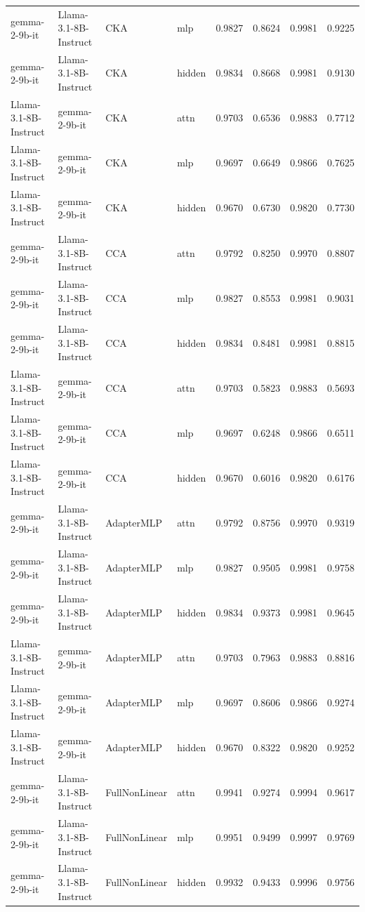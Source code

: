 {\begin{tabularx}{\textwidth}{XXXlcccc}
gemma-2-9b-it & Llama-3.1-8B-Instruct & CKA & mlp & 0.9827 & 0.8624 & 0.9981 & 0.9225 \\
gemma-2-9b-it & Llama-3.1-8B-Instruct & CKA & hidden & 0.9834 & 0.8668 & 0.9981 & 0.9130 \\
Llama-3.1-8B-Instruct & gemma-2-9b-it & CKA & attn & 0.9703 & 0.6536 & 0.9883 & 0.7712 \\
Llama-3.1-8B-Instruct & gemma-2-9b-it & CKA & mlp & 0.9697 & 0.6649 & 0.9866 & 0.7625 \\
Llama-3.1-8B-Instruct & gemma-2-9b-it & CKA & hidden & 0.9670 & 0.6730 & 0.9820 & 0.7730 \\
\midrule
gemma-2-9b-it & Llama-3.1-8B-Instruct & CCA & attn & 0.9792 & 0.8250 & 0.9970 & 0.8807 \\
gemma-2-9b-it & Llama-3.1-8B-Instruct & CCA & mlp & 0.9827 & 0.8553 & 0.9981 & 0.9031 \\
gemma-2-9b-it & Llama-3.1-8B-Instruct & CCA & hidden & 0.9834 & 0.8481 & 0.9981 & 0.8815 \\
Llama-3.1-8B-Instruct & gemma-2-9b-it & CCA & attn & 0.9703 & 0.5823 & 0.9883 & 0.5693 \\
Llama-3.1-8B-Instruct & gemma-2-9b-it & CCA & mlp & 0.9697 & 0.6248 & 0.9866 & 0.6511 \\
Llama-3.1-8B-Instruct & gemma-2-9b-it & CCA & hidden & 0.9670 & 0.6016 & 0.9820 & 0.6176 \\
\midrule
gemma-2-9b-it & Llama-3.1-8B-Instruct & AdapterMLP & attn & 0.9792 & 0.8756 & 0.9970 & 0.9319 \\
gemma-2-9b-it & Llama-3.1-8B-Instruct & AdapterMLP & mlp & 0.9827 & 0.9505 & 0.9981 & 0.9758 \\
gemma-2-9b-it & Llama-3.1-8B-Instruct & AdapterMLP & hidden & 0.9834 & 0.9373 & 0.9981 & 0.9645 \\
Llama-3.1-8B-Instruct & gemma-2-9b-it & AdapterMLP & attn & 0.9703 & 0.7963 & 0.9883 & 0.8816 \\
Llama-3.1-8B-Instruct & gemma-2-9b-it & AdapterMLP & mlp & 0.9697 & 0.8606 & 0.9866 & 0.9274 \\
Llama-3.1-8B-Instruct & gemma-2-9b-it & AdapterMLP & hidden & 0.9670 & 0.8322 & 0.9820 & 0.9252 \\
\midrule
gemma-2-9b-it & Llama-3.1-8B-Instruct & FullNonLinear & attn & 0.9941 & 0.9274 & 0.9994 & 0.9617 \\
gemma-2-9b-it & Llama-3.1-8B-Instruct & FullNonLinear & mlp & 0.9951 & 0.9499 & 0.9997 & 0.9769 \\
gemma-2-9b-it & Llama-3.1-8B-Instruct & FullNonLinear & hidden & 0.9932 & 0.9433 & 0.9996 & 0.9756 \\

\end{tabularx}}
